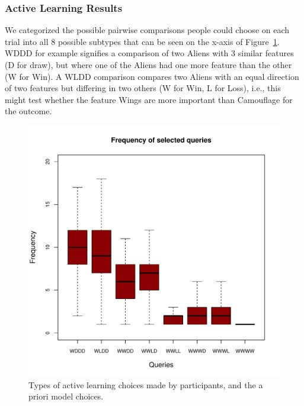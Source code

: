 \documentclass[10pt,letterpaper]{article}
\begin{document}
\subsubsection*{Active Learning Results}
We categorized the possible pairwise comparisons people could choose on each trial into all 8 possible subtypes that can be seen on the x-axis of Figure~\ref{shortoverview}. WDDD for example signifies a comparison of two Aliens with 3 similar features (D for draw), but where one of the Aliens had one more feature than the other (W for Win). A WLDD comparison compares two Aliens with an equal direction of two features but differing in two others (W for Win, L for Loss), i.e., this might test whether the feature Wings are more important than Camouflage for the outcome.
\begin{figure}[htb!]
	\caption{Types of active learning choices made by participants, and the a priori model choices.}
	\label{shortoverview}
	\includegraphics[scale=0.53]{shortoverview.pdf}
\end{figure}
\end{document}
